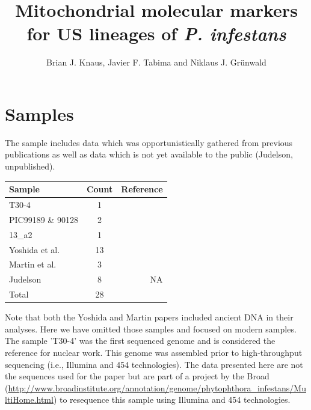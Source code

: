 \documentclass{article}\usepackage[]{graphicx}\usepackage[]{color}
\author{Brian J. Knaus, Javier F. Tabima and Niklaus J. Gr\"{u}nwald}
\title{Mitochondrial molecular markers for US lineages of \emph{P. infestans}}
\begin{document}

\maketitle
\newpage


\tableofcontents

\newpage



\section{Samples}

The sample includes data which was opportunistically gathered from previous publications as well as data which is not yet available to the public (Judelson, unpublished).

\vspace{12pt}

\begin{tabular}{ l c r }
  \hline
  Sample & Count & Reference \\
  \hline
  T30-4 & 1 & \cite{haas2009genome} \\
  PIC99189 \& 90128 & 2 & \cite{raffaele2010analyses} \\
  13\_a2 & 1 & \cite{cooke2012genome} \\
  Yoshida et al. & 13 & \cite{yoshida2013correction} \\
  Martin et al. & 3 & \cite{martin2013reconstructing} \\
  Judelson & 8 & NA \\
  \hline
  Total & 28 & \\
  \hline
\end{tabular}

\vspace{12pt}

Note that both the Yoshida and Martin papers \cite{yoshida2013correction, martin2013reconstructing} included ancient DNA in their analyses.  Here we have omitted those samples and focused on modern samples.  The sample 'T30-4' was the first sequenced genome and is considered the reference for nuclear work.  This genome was assembled prior to high-throughput sequencing (i.e., Illumina and 454 technologies).  The data presented here are not the sequences used for the paper but are part of a project by the Broad (\url{http://www.broadinstitute.org/annotation/genome/phytophthora_infestans/MultiHome.html}) to resequence this sample using Illumina and 454 technologies.
\end{document}
